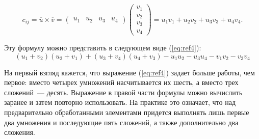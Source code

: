 \begin{equation}
	c_{ij} = \overline{u} \times \overline{v} =
	\begin{pmatrix} u_{1} & u_{2} & u_{3} & u_{4}\end{pmatrix}
	\begin{pmatrix} v_{1} \\ v_{2} \\ v_{3} \\ v_{4}\end{pmatrix} =
	u_{1}v_{1} + u_{2}v_{2} + u_{3}v_{3} + u_{4}v_{4}.
	\label{eq:ref3}
\end{equation}

Эту формулу можно представить в следующем виде (\ref{eq:ref4}):
\begin{equation}
	(u_{1}+v_{2})(u_{2}+v_{1}) + (u_{3}+v_{4})(u_{4}+v_{3}) - u_{1}u_{2} - u_{3}u_{4} - v_{1}v_{2} - v_{3}v_{4}
	\label{eq:ref4}
\end{equation}

На первый взгляд кажется, что выражение (\ref{eq:ref4}) задает больше работы, чем первое: вместо четырех умножений насчитывается их шесть, а вместо трех сложений~--- десять. Выражение в правой части формулы  можно вычислить заранее и затем повторно использовать. На практике это означает, что над предварительно обработанными элементами придется выполнять лишь первые два умножения и последующие пять сложений, а также дополнительно два сложения.